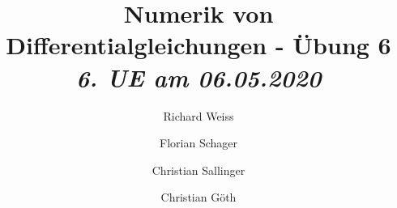 \documentclass{article}
\title
{
  Numerik von Differentialgleichungen - Übung 6 \\
  \vspace{4pt}
  \normalsize
  \textit{6. UE am 06.05.2020}
}
\author
{
  Richard Weiss       \and
  Florian Schager     \and
  Christian Sallinger \and
  Christian Göth
}
\date{}
\begin{document}
\renewcommand{\figurename}{Abbildung}
\maketitle


\pagebreak

\pagebreak



\end{document}
